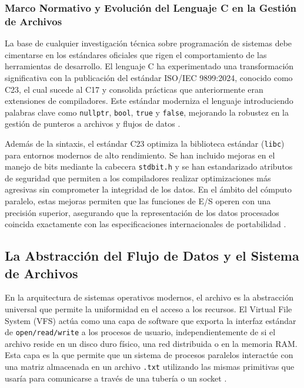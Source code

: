 \subsubsection{Marco Normativo y Evolución del Lenguaje C en la Gestión de Archivos}

La base de cualquier investigación técnica sobre programación de sistemas debe cimentarse en los estándares oficiales que rigen el comportamiento de las herramientas de desarrollo. El lenguaje C ha experimentado una transformación significativa con la publicación del estándar ISO/IEC 9899:2024, conocido como C23, el cual sucede al C17 y consolida prácticas que anteriormente eran extensiones de compiladores. Este estándar moderniza el lenguaje introduciendo palabras clave como \texttt{nullptr}, \texttt{bool}, \texttt{true} y \texttt{false}, mejorando la robustez en la gestión de punteros a archivos y flujos de datos \cite{iso2024c, iso2024c, iso2024c}.

Además de la sintaxis, el estándar C23 optimiza la biblioteca estándar (\texttt{libc}) para entornos modernos de alto rendimiento. Se han incluido mejoras en el manejo de bits mediante la cabecera \texttt{stdbit.h} y se han estandarizado atributos de seguridad que permiten a los compiladores realizar optimizaciones más agresivas sin comprometer la integridad de los datos. En el ámbito del cómputo paralelo, estas mejoras permiten que las funciones de E/S operen con una precisión superior, asegurando que la representación de los datos procesados coincida exactamente con las especificaciones internacionales de portabilidad \cite{iso2024c, iso2024c, iso2024c}.

\subsection{La Abstracción del Flujo de Datos y el Sistema de Archivos}

En la arquitectura de sistemas operativos modernos, el archivo es la abstracción universal que permite la uniformidad en el acceso a los recursos. El Virtual File System (VFS) actúa como una capa de software que exporta la interfaz estándar de \texttt{open/read/write} a los procesos de usuario, independientemente de si el archivo reside en un disco duro físico, una red distribuida o en la memoria RAM. Esta capa es la que permite que un sistema de procesos paralelos interactúe con una matriz almacenada en un archivo \texttt{.txt} utilizando las mismas primitivas que usaría para comunicarse a través de una tubería o un socket \cite{berkeley_cs162, linux_man}.

